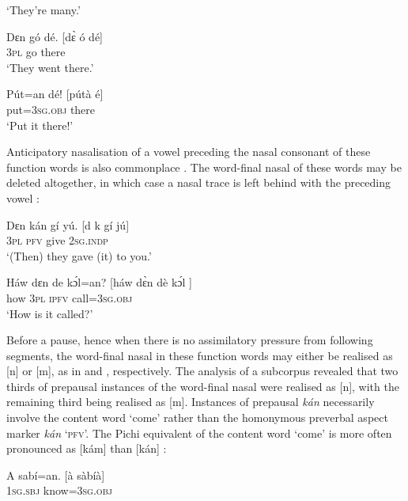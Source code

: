 \glt ‘They’re many.’
\z


\ea%
    \label{ex:key:28}
    \gll   Dɛn    gó  dé.            [dɛ̀    ó  dé]\\
\textsc{3pl}    go  there\\
\glt ‘They went there.’
\z


\ea%
    \label{ex:key:29}
    \gll   Pút=an    dé!            [pútà  é]\\
put=\textsc{3sg.obj}  there\\

\glt ‘Put it there!’
\z

Anticipatory nasalisation of a vowel preceding the nasal consonant of these function words is also commonplace . The word-final nasal of these words may be deleted altogether, in which case a nasal trace is left behind with the preceding vowel :


\ea%
    \label{ex:key:30}
    \gll   Dɛn    kán    gí    yú.      [d    k    gí  jú]\\
\textsc{3pl}    \textsc{pfv}    give    \textsc{2sg.indp}\\

\glt ‘(Then) they gave (it) to you.’
\z


\ea%
    \label{ex:key:31}
    \gll   Háw    dɛn  de  kɔ́l=an?        [háw  dɛ̀n  dè  kɔ́l  ]\\
how    \textsc{3pl}  \textsc{ipfv}  call=\textsc{3sg.obj}\\

\glt ‘How is it called?’
\z

Before a pause, hence when there is no assimilatory pressure from following segments, the word-final nasal in these function words may either be realised as [n] or [m], as in  and , respectively. The analysis of a subcorpus revealed that two thirds of prepausal instances of the word-final nasal were realised as [n], with the remaining third being realised as [m]. Instances of prepausal \textit{kán} necessarily involve the content word ‘come’ rather than the homonymous preverbal aspect marker \textit{kán} ‘\textsc{pfv}’. The Pichi equivalent of the content word ‘come’ is more often pronounced as [kám] than [kán] :


\ea%
    \label{ex:key:32}
    \gll   A    sabí=an.            [à  sàbíà]\\
\textsc{1sg.sbj}  know=\textsc{3sg.obj}\\


